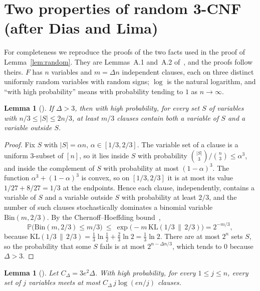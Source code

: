 \documentclass[11pt,a4paper]{article}
\newtheorem{lemma}[theorem]{Lemma}
\theoremstyle{definition}
\theoremstyle{remark}
\newcommand{\PP}{\mathbb{P}}
\begin{document}
\appendix
\section{Two properties of random 3-CNF (after Dias and Lima)}\label{app:random}

For completeness we reproduce the proofs of the two facts used in the proof of
Lemma~\ref{lem:random}. They are Lemmas~A.1 and~A.2 of~\cite{DL}, and the proofs follow
theirs. $F$ has $n$ variables and $m=\Delta n$ independent clauses, each on three distinct
uniformly random variables with random signs; $\log$ is the natural logarithm, and ``with
high probability'' means with probability tending to $1$ as $n\to\infty$.

\begin{lemma}[{\cite[Lemma~A.1]{DL}}]\label{lem:A1}
If $\Delta>3$, then with high probability, for every set $S$ of variables with
$n/3\le|S|\le2n/3$, at least $m/3$ clauses contain both a variable of $S$ and a variable
outside $S$.
\end{lemma}

\begin{proof}
Fix $S$ with $|S|=\alpha n$, $\alpha\in[1/3,2/3]$. The variable set of a clause is a uniform
$3$-subset of $[n]$, so it lies inside $S$ with probability
$\binom{|S|}{3}/\binom n3\le\alpha^3$, and inside the complement of $S$ with probability at
most $(1-\alpha)^3$. The function $\alpha^3+(1-\alpha)^3$ is convex, so on $[1/3,2/3]$ it is
at most its value $1/27+8/27=1/3$ at the endpoints. Hence each clause, independently,
contains a variable of $S$ and a variable outside $S$ with probability at least $2/3$, and
the number of such clauses stochastically dominates a binomial variable
$\mathrm{Bin}(m,2/3)$. By the Chernoff--Hoeffding bound~\cite[Theorem~1]{Hoe63},
\[
\PP\bigl(\mathrm{Bin}(m,2/3)\le m/3\bigr)\ \le\ \exp\bigl(-m\,\mathrm{KL}(1/3\,\|\,2/3)\bigr)
=2^{-m/3},
\]
because $\mathrm{KL}(1/3\,\|\,2/3)=\frac13\ln\frac12+\frac23\ln2=\frac13\ln2$. There are at
most $2^n$ sets $S$, so the probability that some $S$ fails is at most
$2^{n-\Delta n/3}$, which tends to $0$ because $\Delta>3$.
\end{proof}

\begin{lemma}[{\cite[Lemma~A.2]{DL}}]\label{lem:A2}
Let $C_\Delta=3e^2\Delta$. With high probability, for every $1\le j\le n$, every set of $j$
variables meets at most $C_\Delta\,j\log(en/j)$ clauses.
\end{lemma}
\end{document}
